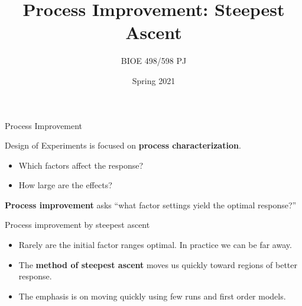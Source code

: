 \documentclass[10pt]{beamer}\usepackage[]{graphicx}\usepackage[]{color}
\title{Process Improvement: Steepest Ascent}
\author{BIOE 498/598 PJ}
\date{Spring 2021}
\begin{document}
\frame{\titlepage}


\begin{frame}{Process Improvement}

Design of Experiments is focused on \textbf{process characterization}.
\begin{itemize}
  \item Which factors affect the response?
  \item How large are the effects?
\end{itemize}

\bigskip
\pause
\textbf{Process improvement} asks ``what factor settings yield the optimal response?''

\begin{center}
\end{center}

\end{frame}

\begin{frame}{Process improvement by steepest ascent}

\begin{itemize}
  \item Rarely are the initial factor ranges optimal. In practice we can be far away.
  \item<2-> The \textbf{method of steepest ascent} moves us quickly toward regions of better response.
  \item<3-> The emphasis is on moving quickly using few runs and first order models.
\end{itemize}

\end{frame}
\end{document}
